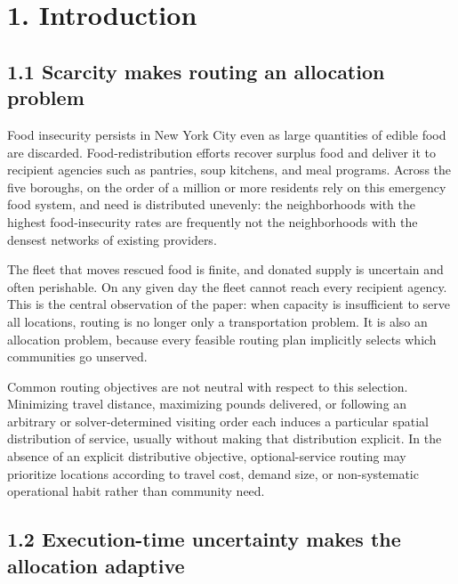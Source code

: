 \documentclass[
  11pt,
]{article}
\begin{document}
\section{1. Introduction}\label{introduction}

\subsection{1.1 Scarcity makes routing an allocation
problem}\label{scarcity-makes-routing-an-allocation-problem}

Food insecurity persists in New York City even as large quantities of
edible food are discarded. Food-redistribution efforts recover surplus
food and deliver it to recipient agencies such as pantries, soup
kitchens, and meal programs. Across the five boroughs, on the order of a
million or more residents rely on this emergency food system, and need
is distributed unevenly: the neighborhoods with the highest
food-insecurity rates are frequently not the neighborhoods with the
densest networks of existing providers.

The fleet that moves rescued food is finite, and donated supply is
uncertain and often perishable. On any given day the fleet cannot reach
every recipient agency. This is the central observation of the paper:
when capacity is insufficient to serve all locations, routing is no
longer only a transportation problem. It is also an allocation problem,
because every feasible routing plan implicitly selects which communities
go unserved.

Common routing objectives are not neutral with respect to this
selection. Minimizing travel distance, maximizing pounds delivered, or
following an arbitrary or solver-determined visiting order each induces
a particular spatial distribution of service, usually without making
that distribution explicit. In the absence of an explicit distributive
objective, optional-service routing may prioritize locations according
to travel cost, demand size, or non-systematic operational habit rather
than community need.

\subsection{1.2 Execution-time uncertainty makes the allocation
adaptive}\label{execution-time-uncertainty-makes-the-allocation-adaptive}
\end{document}

